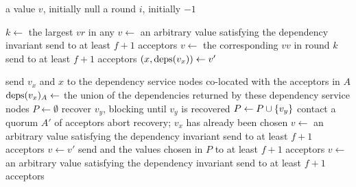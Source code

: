 \newcommand{\nullbot}{\textsf{null}}

\begin{algorithm*}[ht]
  \caption{%
    Majority Commit \BPaxos{} Proposer. Pseudocode for initiating recovery and
    handling  messages is ommitted because it is identical to
    the pseudocode in .
  }%
  \begin{algorithmic}[1]
    \GlobalState a value $v$, initially \nullbot{}
    \GlobalState a round $i$, initially $-1$

      \State $k \gets$ the largest $vr$ in any 
       
        \State $v \gets$ an arbitrary value satisfying the dependency invariant
        \State send  to at least $f + 1$ acceptors
       
        \State $v \gets$ the corresponding $vv$ in round $k$
        \State send  to at least $f + 1$ acceptors
       
        \State $(x, \text{deps}(v_x)) \gets v'$

        \State send $v_x$ and $x$ to the dependency service nodes co-located
               with the acceptors in $A$
        \State $\text{deps}(v_x)_A \gets$ the union of the dependencies returned by
               these dependency service nodes
        \State
        \State $P \gets \emptyset$
            \State recover $v_y$, blocking until $v_y$ is recovered
          \EndIf
            \State $P \gets P \cup \{v_y\}$
          \Else{}
            \State contact a quorum $A'$ of acceptors
              \State abort recovery; $v_x$ has already been chosen
            \Else{}
              \State $v \gets$ an arbitrary value satisfying the dependency invariant
              \State send  to at least $f + 1$ acceptors
            \EndIf{}
          \EndIf{}
        \EndFor{}
        \State $v \gets v'$
        \State send  and the values chosen in $P$ to at
               least $f + 1$ acceptors
      \Else{} 
        \State $v \gets$ an arbitrary value satisfying the dependency invariant
        \State send  to at least $f + 1$ acceptors
      \EndIf
    \EndUpon
  \end{algorithmic}
\end{algorithm*}
